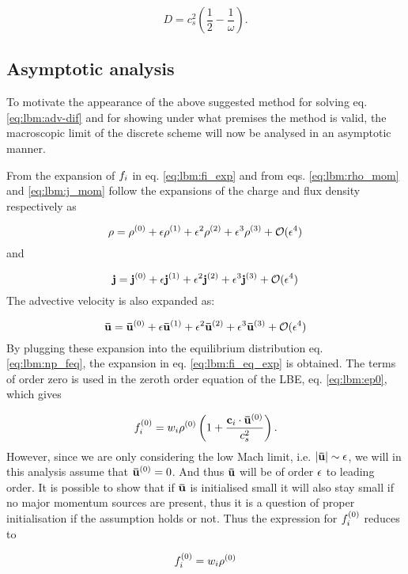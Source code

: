 \begin{equation}
D = c_s^2 \left( \frac{1}{2} - \frac{1}{\omega} \right).
\end{equation}

\subsection{Asymptotic analysis}
To motivate the appearance of the above suggested method for solving
eq. \eqref{eq:lbm:adv-dif} and for showing under what premises the
method is valid, the macroscopic limit of the discrete scheme will
now be analysed in an asymptotic manner.

From the expansion of $f_i$ in eq. \eqref{eq:lbm:fi_exp} and from
eqs. \eqref{eq:lbm:rho_mom} and \eqref{eq:lbm:j_mom} follow the
expansions of the charge and flux density respectively as

\begin{equation}
\rho = \rho^{(0)} + \epsilon\rho^{(1)} + \epsilon^2\rho^{(2)} + \epsilon^3\rho^{(3)} + \mathcal{O}(\epsilon^4)
\end{equation} 
and

\begin{equation}
\mathbf{j} = \mathbf{j}^{(0)} + \epsilon\mathbf{j}^{(1)} + \epsilon^2\mathbf{j}^{(2)} + \epsilon^3\mathbf{j}^{(3)} + \mathcal{O}(\epsilon^4)
\end{equation} 
The advective velocity is also expanded as: 

\begin{equation}
\mathbf{\bar{u}} = \mathbf{\bar{u}}^{(0)} + \epsilon\mathbf{\bar{u}}^{(1)} + \epsilon^2\mathbf{\bar{u}}^{(2)} + \epsilon^3\mathbf{\bar{u}}^{(3)} + \mathcal{O}(\epsilon^4)
\end{equation}
By plugging these expansion into the equilibrium distribution
eq. \eqref{eq:lbm:np_feq}, the expansion in
eq. \eqref{eq:lbm:fi_eq_exp} is obtained. The terms of order zero is
used in the zeroth order equation of the LBE, eq. \eqref{eq:lbm:ep0},
which gives

\begin{equation}
f_i^{(0)} = w_i\rho^{(0)} \left( 1 + \frac{\mathbf{c}_i \cdot \mathbf{\bar{u}}^{(0)}}{c_s^2} \right).
\end{equation}
However, since we are only considering the low Mach limit,
i.e. $|\mathbf{\bar{u}}| \sim \epsilon$, we will in this analysis assume that
$\mathbf{\bar{u}}^{(0)} = 0$. And thus $\mathbf{\bar{u}}$ will be of order $\epsilon$ to leading
order. It is possible to show \cite{junk-asymp} that if $\mathbf{\bar{u}}$ is
initialised small it will also stay small if no major momentum sources
are present, thus it is a question of proper initialisation if the
assumption holds or not. Thus the expression for $f_i^{(0)}$ reduces to

\begin{equation}
f_i^{(0)} = w_i\rho^{(0)}
\end{equation}


